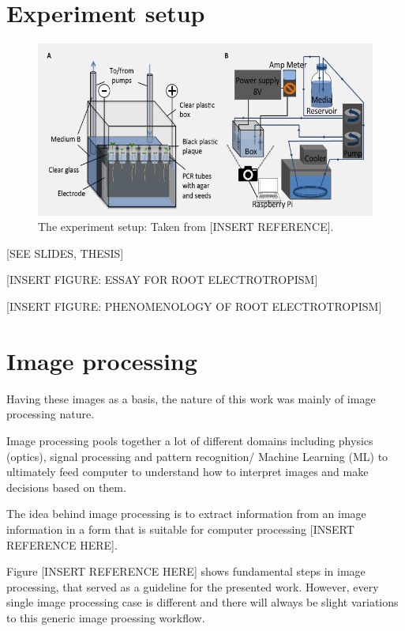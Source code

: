 \section{Experiment setup}

\begin{figure}[h]
	\centering
	\includegraphics[width=\textwidth]{../Figures/experiment_circuit.png}
	\caption{The experiment setup: Taken from [INSERT REFERENCE].}
	\label{fig:experiment}
\end{figure}

[SEE SLIDES, THESIS]

[INSERT FIGURE: ESSAY FOR ROOT ELECTROTROPISM]

[INSERT FIGURE: PHENOMENOLOGY OF ROOT ELECTROTROPISM]


\section{Image processing}

Having these images as a basis, the nature of this work was mainly of image processing nature.

Image processing pools together a lot of different domains including physics (optics), signal processing and pattern recognition/ Machine Learning (ML) to ultimately feed computer to understand how to interpret images and make decisions based on them. 

The idea behind image processing is to extract information from an image information in a form that is suitable for computer processing [INSERT REFERENCE HERE]. 

Figure [INSERT REFERENCE HERE] shows fundamental steps in image processing, that served as a guideline for the presented work. However, every single image processing case is different and there will always be slight variations to this generic image proessing workflow.


